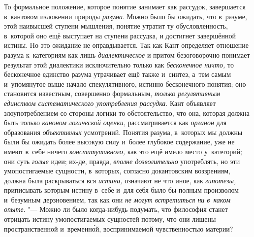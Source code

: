 То формальное положение, которое понятие занимает как
рассудок, завершается в~кантовом изложении природы
{\em разума}. Можно было
бы ожидать, что в~разуме, этой наивысшей ступени мышления, понятие утратит
ту обусловленность, в~которой оно ещё выступает на ступени рассудка, и
достигнет завершённой истины. Но это ожидание не оправдывается. Так как
Кант определяет отношение разума к~категориям как лишь
{\em диалектическое} и
притом безоговорочно понимает результат этой диалектики исключительно
только как {\em бесконечное ничто,}
то бесконечное единство разума утрачивает ещё
также и~синтез, а~тем самым и~упомянутое выше начало
спекулятивного, истинно бесконечного понятия; оно становится известным,
совершенно формальным, {\em только
регулятивным единством систематического употребления рассудка}.
Кант объявляет злоупотреблением со стороны логики то
обстоятельство, что она, которая должна быть только
{\em каноном логической оценки,}
рассматривается как
{\em органон} для
образования {\em объективных}
усмотрений. Понятия разума, в~которых мы должны были бы
ожидать более высокую силу и~более глубокое содержание, уже не имеют в~себе
ничего {\em конститутивного,}
как это ещё имело место у~категорий; они суть
{\em голые} идеи; их-де,
правда, {\em вполне дозволительно}
употреблять, но эти умопостигаемые сущности, в~которых,
согласно докантовским воззрениям, должна была раскрываться вся
{\em истина,} означают не
что иное, как {\em гипотезы,}
приписывать которым истину в~себе и~для себя было бы полным
произволом и~безумным дерзновением, так как они
{\em не могут встретиться ни в~каком
опыте}. "--- Можно ли было когда-нибудь подумать, что философия
станет отрицать истину умопостигаемых сущностей потому, что они лишены
пространственной и~временн\'{о}й, воспринимаемой чувственностью материи?

